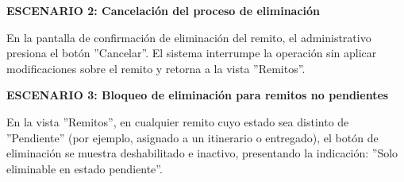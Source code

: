\documentclass[a4paper,9pt]{article}
\begin{document}
\begin{tcolorbox}[hucard, title={\textbf{HU-42: ELIMINAR REMITO} \hfill \scriptsize \colorbox{tealstatus}{\textbf{\ Accepted\ }} \quad \colorbox{white}{\textcolor{primarydark}{\textbf{\ 2 pts\ }}}}]
{\noindent\textbf{\textcolor{secondarydark}{ESCENARIO 2:  Cancelación del proceso de eliminación}}\par\vspace{1pt}
En la pantalla de confirmación de eliminación del remito, el administrativo presiona el botón ''Cancelar''. El sistema interrumpe la operación sin aplicar modificaciones sobre el remito y retorna a la vista ''Remitos''.\par\vspace{2.5pt}
\noindent\textbf{\textcolor{secondarydark}{ESCENARIO 3:  Bloqueo de eliminación para remitos no pendientes}}\par\vspace{1pt}
En la vista ''Remitos'', en cualquier remito cuyo estado sea distinto de ''Pendiente'' (por ejemplo, asignado a un itinerario o entregado), el botón de eliminación se muestra deshabilitado e inactivo, presentando la indicación: ''Solo eliminable en estado pendiente''.\par\vspace{2.5pt}
}\par
\end{tcolorbox}
\end{document}
